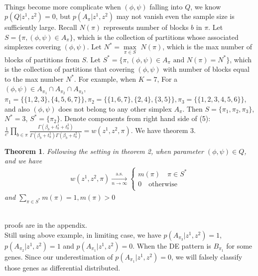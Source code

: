 \documentclass[11pt]{amsart}
\newtheorem{theorem}{Theorem}
\begin{document}
\hfill\\
Things become more complicate when $(\phi, \psi)$ falling into $Q$, we know $p(Q | z^1, z^2) = 0$, but $p(A_\pi | z^1, z^2)$ may not vanish even the sample size is sufficiently large. Recall $N(\pi)$ represents number of blocks $b$ in $\pi$. Let $S = \{\pi,  (\phi, \psi) \in A_\pi\}$, which is the collection of partitions whose associated simplexes covering $(\phi,\psi)$. Let $N^* = \underset{\pi\in S}\max$ $N(\pi)$, which is the max number of blocks of partitions from $S$. Let $S^* = \{\pi,  (\phi, \psi) \in A_\pi \text{ and } N(\pi) = N^*\}$, which is the collection of partitions that covering $(\phi, \psi)$ with number of blocks equal to the max number $N^*$. For example, when $K = 7$, For a $(\phi, \psi)\in A_{\pi_1} \cap A_{\pi_2} \cap A_{\pi_3}$, $\pi_1 = \{\{1,2,3\}, \{4,5,6,7\}\}, \pi_2 = \{\{1,6,7\}, \{2,4\},\{3,5\}\}, \pi_3 = \{\{1,2,3,4,5,6\}\}$, and also $(\phi, \psi)$ does not belong to any other simplex $A_\pi$. Then $S = \{\pi_1, \pi_2, \pi_3\}$, $N^* = 3$, $S^* = \{\pi_2\}.$ Denote components from right hand side of (5): $\frac{1}{c'}\underset{b\in \pi}\prod\frac{ \Gamma(\beta_b + t_b^1 + t_b^2)}{\Gamma(\beta_b + t_b^1)\Gamma(\beta_b + t_b^2)} = w(z^1,z^2,\pi).$  We have theorem 3.\\
\begin{theorem} Following the setting in theorem 2, when parameter $(\phi, \psi)\in Q$,  and we have 
\begin{eqnarray*}
    w(z^1,z^2,\pi) \xrightarrow[n\rightarrow\infty]{\text{a.s.}}\left\{
                \begin{array}{ll}
                 m(\pi) \quad  \pi \in S^* \\
                 0 \quad \text{otherwise}\\             
                \end{array}
              \right.
\end{eqnarray*}
and $\underset{\pi\in S^*}\sum m(\pi) = 1, m(\pi) > 0$\\
\end{theorem}\hfill\\
proofs are in the appendix.\\
Still using above example, in limiting case, we have $p(A_{\pi_3} | z^1, z^2) = 1$, $p(A_{\pi_2} | z^1, z^2) = 1$ and $p(A_{\pi_1}| z^1, z^2) = 0$. When the DE pattern is $B_{\pi_1}$ for some genes. Since our underestimation of $p(A_{\pi_1}| z^1, z^2) = 0$, we will falsely classify those genes as differential distributed.
\end{document}
